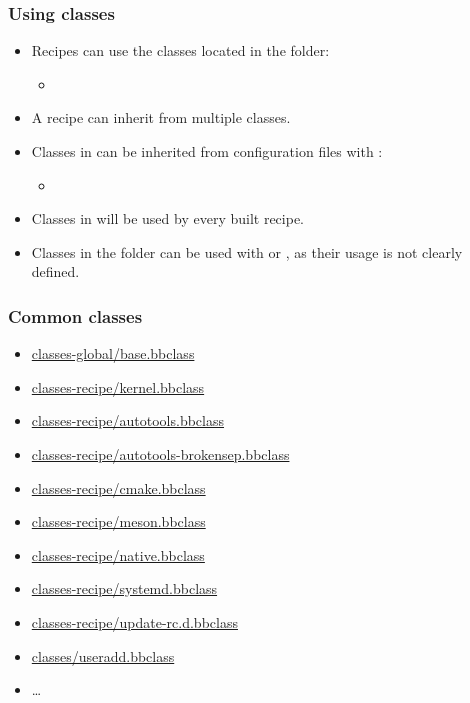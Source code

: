 \begin{frame}
  \frametitle{Using classes}
  \begin{itemize}
    \item Recipes can use the classes located in the 
      folder:
    \begin{itemize}
      \item {}
    \end{itemize}
    \item A recipe can inherit from multiple classes.
    \item Classes in  can be inherited from configuration
      files with :
    \begin{itemize}
      \item {}
    \end{itemize}
    \item Classes in  will be used by every built recipe.
    \item Classes in the  folder can be used with  or
      , as their usage is not clearly defined.
  \end{itemize}
\end{frame}

\begin{frame}
  \frametitle{Common classes}
  \begin{itemize}
    \item \href{https://docs.yoctoproject.org/ref-manual/classes.html\#base}{classes-global/base.bbclass}
    \item \href{https://docs.yoctoproject.org/ref-manual/classes.html\#kernel}{classes-recipe/kernel.bbclass}
    \item \href{https://docs.yoctoproject.org/ref-manual/classes.html\#autotools}{classes-recipe/autotools.bbclass}
    \item \href{https://docs.yoctoproject.org/ref-manual/classes.html\#autotools}{classes-recipe/autotools-brokensep.bbclass}
    \item \href{https://docs.yoctoproject.org/ref-manual/classes.html\#cmake}{classes-recipe/cmake.bbclass}
    \item \href{https://docs.yoctoproject.org/ref-manual/classes.html\#meson}{classes-recipe/meson.bbclass}
    \item \href{https://docs.yoctoproject.org/ref-manual/classes.html\#native}{classes-recipe/native.bbclass}
    \item \href{https://docs.yoctoproject.org/ref-manual/classes.html\#systemd}{classes-recipe/systemd.bbclass}
    \item \href{https://docs.yoctoproject.org/ref-manual/classes.html\#update-rc-d}{classes-recipe/update-rc.d.bbclass}
    \item \href{https://docs.yoctoproject.org/ref-manual/classes.html\#useradd}{classes/useradd.bbclass}
    \item \dots
  \end{itemize}
\end{frame}

